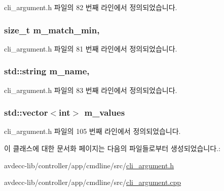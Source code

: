 cli\+\_\+argument.\+h 파일의 82 번째 라인에서 정의되었습니다.

\subsubsection[{\texorpdfstring{m\+\_\+match\+\_\+min}{m_match_min}}]{\setlength{\rightskip}{0pt plus 5cm}size\+\_\+t m\+\_\+match\+\_\+min\hspace{0.3cm}{\ttfamily [protected]}, {\ttfamily [inherited]}}\hypertarget{classcli__argument_a9e9208481670105577821d0a1aee5179}{}\label{classcli__argument_a9e9208481670105577821d0a1aee5179}


cli\+\_\+argument.\+h 파일의 81 번째 라인에서 정의되었습니다.

\subsubsection[{\texorpdfstring{m\+\_\+name}{m_name}}]{\setlength{\rightskip}{0pt plus 5cm}std\+::string m\+\_\+name\hspace{0.3cm}{\ttfamily [protected]}, {\ttfamily [inherited]}}\hypertarget{classcli__argument_adb41893ba19e889e56c559f25fc1a68a}{}\label{classcli__argument_adb41893ba19e889e56c559f25fc1a68a}


cli\+\_\+argument.\+h 파일의 83 번째 라인에서 정의되었습니다.

\subsubsection[{\texorpdfstring{m\+\_\+values}{m_values}}]{\setlength{\rightskip}{0pt plus 5cm}std\+::vector$<$int$>$ m\+\_\+values\hspace{0.3cm}{\ttfamily [private]}}\hypertarget{classcli__argument__int_a36798cf959b4fd3cf2135baea640ab78}{}\label{classcli__argument__int_a36798cf959b4fd3cf2135baea640ab78}


cli\+\_\+argument.\+h 파일의 105 번째 라인에서 정의되었습니다.



이 클래스에 대한 문서화 페이지는 다음의 파일들로부터 생성되었습니다.\+:\begin{DoxyCompactItemize}
\item 
avdecc-\/lib/controller/app/cmdline/src/\hyperlink{cli__argument_8h}{cli\+\_\+argument.\+h}\item 
avdecc-\/lib/controller/app/cmdline/src/\hyperlink{cli__argument_8cpp}{cli\+\_\+argument.\+cpp}\end{DoxyCompactItemize}
